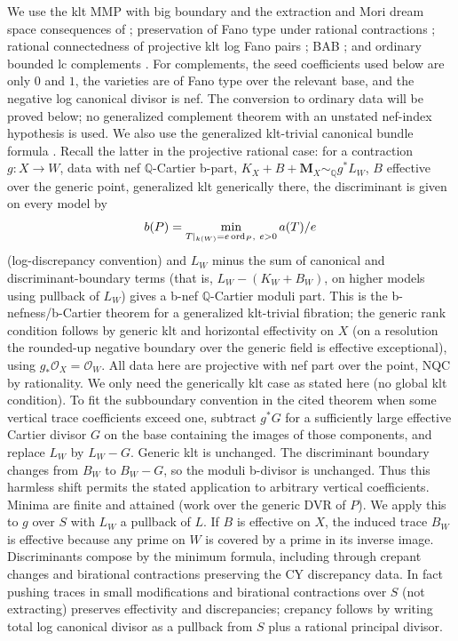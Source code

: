 We use the klt MMP with big boundary and the extraction and Mori dream
space consequences of \cite{BCHM}; preservation of Fano type under rational
contractions \cite[p.~155 and Lemma~2.8]{ProkhorovShokurov}; rational connectedness of
projective klt log Fano pairs
\cite[Corollary 1.13]{HaconMcKernan}\cite[Theorem 1]{ZhangRC};
BAB \cite[Theorem 1.1]{BirkarBAB}; and ordinary bounded lc complements
\cite[Theorems 1.7 and 1.8]{BirkarComplements}.
For complements, the seed coefficients used below are only \(0\) and
\(1\), the varieties are of Fano type over the relevant base, and the
negative log canonical divisor is nef.  The conversion to ordinary data
will be proved below; no generalized complement theorem with an
unstated nef-index hypothesis is used.
We also use the generalized klt-trivial canonical bundle formula
\cite[Theorem~1.4 and Sections~4--5]{Filipazzi}.
Recall the latter in the projective rational case: for a contraction \(g:X\to W\), data with nef \(\mathbb Q\)-Cartier b-part, \(K_X+B+\mathbf M_X\sim_{\mathbb Q}g^*L_W\), \(B\) effective over the generic point, generalized klt generically there, the discriminant is given on every model by
\begin{equation}\label{eq:A-discriminant-minimum}
   b(P)=\min_{T|_{k(W)}=e\,{\rm ord}_P,\ e>0} a(T)/e
\end{equation}
(log-discrepancy convention) and \(L_W\) minus the sum of canonical and discriminant-boundary terms (that is, \(L_W-(K_W+B_W)\), on higher models using pullback of \(L_W\)) gives a b-nef \(\mathbb Q\)-Cartier moduli part.
This is the b-nefness/b-Cartier theorem for a generalized klt-trivial fibration; the generic rank condition follows by generic klt and horizontal effectivity on \(X\) (on a resolution the rounded-up negative boundary over the generic field is effective exceptional), using \(g_*\mathcal O_X=\mathcal O_W\).
All data here are projective with nef part over the point, NQC by rationality.
We only need the generically klt case as stated here (no global klt condition).
To fit the subboundary convention in the cited theorem when some vertical
trace coefficients exceed one, subtract \(g^*G\) for a sufficiently large
effective Cartier divisor \(G\) on the base containing the images of
those components, and replace \(L_W\) by \(L_W-G\).  Generic klt is
unchanged.  The discriminant boundary changes from \(B_W\) to
\(B_W-G\), so the moduli b-divisor is unchanged.  Thus this harmless
shift permits the stated application to arbitrary vertical coefficients.
Minima are finite and attained (work over the generic DVR of \(P\)).
We apply this to \(g\) over \(S\) with \(L_W\) a pullback of \(L\).
If \(B\) is effective on \(X\), the induced trace \(B_W\) is effective because any prime on \(W\) is covered by a prime in its inverse image.
Discriminants compose by the minimum formula, including through crepant changes and birational contractions preserving the CY discrepancy data.
In fact pushing traces in small modifications and birational contractions over \(S\) (not extracting) preserves effectivity and discrepancies; crepancy follows by writing total log canonical divisor as a pullback from \(S\) plus a rational principal divisor.

